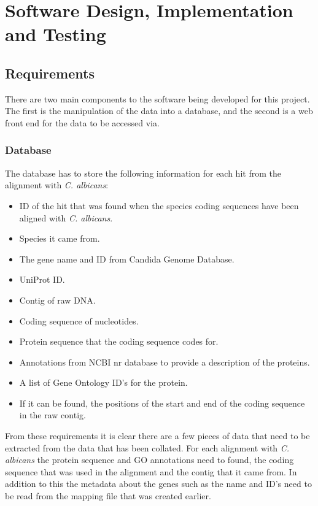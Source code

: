 \chapter{Software Design, Implementation and Testing}

\section{Requirements}
There are two main components to the software being developed for this project. The first is the manipulation of the data into a database, and the second is a web front end for the data to be accessed via. 

\subsection{Database}
The database has to store the following information for each hit from the alignment with \textit{C. albicans}:

\begin{itemize}
  \item ID of the hit that was found when the species coding sequences have been aligned with \textit{C. albicans}.
  \item Species it came from.
  \item The gene name and ID from Candida Genome Database.
  \item UniProt ID.
  \item Contig of raw DNA.
  \item Coding sequence of nucleotides.
  \item Protein sequence that the coding sequence codes for.
  \item Annotations from NCBI nr database to provide a description of the proteins.
  \item A list of Gene Ontology\cite{geneontology} ID's for the protein.
  \item If it can be found, the positions of the start and end of the coding sequence in the raw contig. 
\end{itemize}

From these requirements it is clear there are a few pieces of data that need to be extracted from the data that has been collated. For each alignment with \textit{C. albicans} the protein sequence and GO annotations need to found, the coding sequence that was used in the alignment and the contig that it came from. In addition to this the metadata about the genes such as the name and ID's need to be read from the mapping file that was created earlier. 

